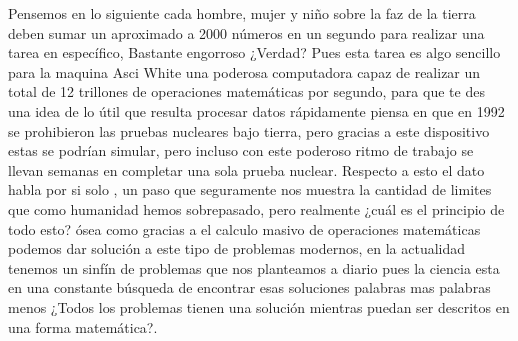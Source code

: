 \documentclass{article}
\begin{document}
Pensemos en lo siguiente cada hombre, mujer y niño sobre la faz de la tierra deben sumar un aproximado a 2000 números en un segundo para realizar una tarea en específico, Bastante engorroso ¿Verdad? Pues esta tarea es algo sencillo para la maquina Asci White una poderosa computadora capaz de realizar un total de 12 trillones de operaciones matemáticas por segundo, para que te des una idea de lo útil que resulta procesar datos rápidamente piensa en que en 1992 se prohibieron las pruebas nucleares bajo tierra, pero gracias a este dispositivo estas se podrían simular, pero incluso con este poderoso ritmo de trabajo se llevan semanas en completar una sola prueba nuclear. Respecto a esto el dato habla por si solo , un paso que seguramente nos muestra la cantidad de limites que como humanidad hemos sobrepasado, pero realmente ¿cuál es el principio de todo esto? ósea como gracias a el calculo masivo de operaciones matemáticas podemos dar solución a este tipo de problemas modernos, en la actualidad tenemos un sinfín de problemas que nos planteamos a diario pues la ciencia esta en una constante búsqueda de encontrar esas soluciones palabras mas palabras menos ¿Todos los problemas tienen una solución mientras puedan ser descritos en una forma matemática?. 

\par 
\vspace{4mm}
\end{document}
